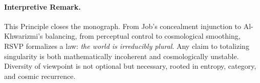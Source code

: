 \documentclass[a4paper,11pt,openany]{book}
\begin{document}
\paragraph{Interpretive Remark.}  
This Principle closes the monograph. From Job’s concealment injunction to 
Al-Khwarizmi’s balancing, from perceptual control to cosmological smoothing, 
RSVP formalizes a law: \emph{the world is irreducibly plural}. 
Any claim to totalizing singularity is both mathematically incoherent and 
cosmologically unstable. Diversity of viewpoint is not optional but necessary, 
rooted in entropy, category, and cosmic recurrence.  

\appendix



\end{document}
